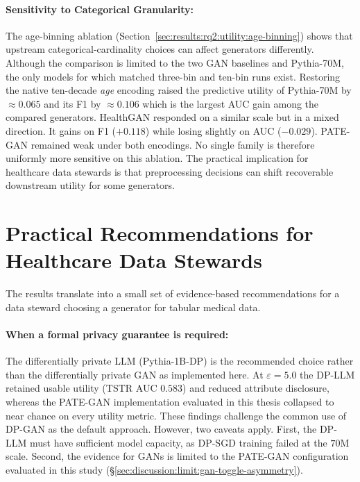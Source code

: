 \paragraph{Sensitivity to Categorical Granularity:}
The age-binning ablation
(Section~\ref{sec:results:rq2:utility:age-binning}) shows that upstream
categorical-cardinality choices can affect generators differently. Although
the comparison is limited to the two GAN baselines and Pythia-70M, the only
models for which matched three-bin and ten-bin runs exist. Restoring the
native ten-decade \emph{age} encoding raised the predictive utility
of Pythia-70M by $\approx 0.065$ and its F1 by $\approx 0.106$ which is the
largest AUC gain among the compared generators. HealthGAN responded on a
similar scale but in a mixed direction. It gains on F1 ($+0.118$) while
losing slightly on AUC ($-0.029$). PATE-GAN remained weak under
both encodings. No single family is therefore uniformly more sensitive on
this ablation. The practical implication for healthcare data stewards is
that preprocessing decisions
can shift recoverable downstream utility for some generators.

\section{Practical Recommendations for Healthcare Data Stewards}
\label{sec:discussion:recommendations}

The results translate into a small set of evidence-based recommendations
for a data steward choosing a generator for tabular medical data.

\paragraph{When a formal privacy guarantee is required:}
The differentially private LLM (Pythia-1B-DP) is the recommended choice
rather than the differentially private GAN as implemented here. At
$\varepsilon = 5.0$ the DP-LLM retained usable utility (TSTR AUC $0.583$)
and reduced attribute disclosure, whereas the PATE-GAN implementation
evaluated in this thesis collapsed to near chance on every utility metric.
These findings challenge the common use of DP-GAN as the default
approach. However, two caveats apply. First, the DP-LLM must have
sufficient model capacity, as DP-SGD training failed at the $70$M scale.
Second, the evidence for GANs is limited to the PATE-GAN configuration
evaluated in this study (\S\ref{sec:discussion:limit:gan-toggle-asymmetry}).

